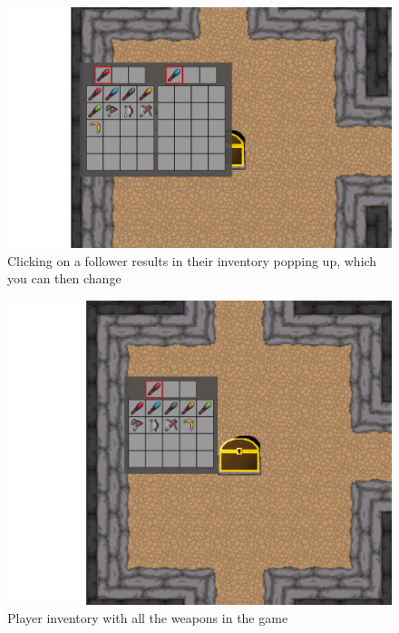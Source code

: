 \documentclass[../Main.tex]{subfiles}
\begin{document}
            \begin{figure}[hbt!]
                \centerline{\includegraphics[scale=0.4]{img/Testing/Objective/FollowerInventory.png}}
                \caption{Clicking on a follower results in their inventory popping up, which you can then change}
                \label{fig:FollowerInventory}
            \end{figure}
            \begin{figure}[hbt!]
                \centerline{\includegraphics[scale=0.4]{img/Testing/Objective/PlayerInventory.png}}
                \caption{Player inventory with all the weapons in the game}
                \label{fig:PlayerInventory}
            \end{figure}
\end{document}

